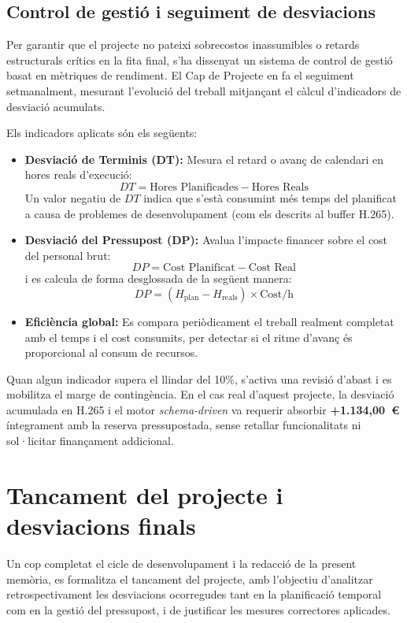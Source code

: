 \subsection{Control de gestió i seguiment de desviacions}
Per garantir que el projecte no pateixi sobrecostos inassumibles o retards estructurals crítics en la fita final, s'ha dissenyat un sistema de control de gestió basat en mètriques de rendiment. El Cap de Projecte en fa el seguiment setmanalment, mesurant l'evolució del treball mitjançant el càlcul d'indicadors de desviació acumulats.

Els indicadors aplicats són els següents:
\begin{itemize}
  \item \textbf{Desviació de Terminis (DT):} Mesura el retard o avanç de calendari en hores reals d'execució:
  \[ DT = \text{Hores Planificades} - \text{Hores Reals} \]
  Un valor negatiu de $DT$ indica que s'està consumint més temps del planificat a causa de problemes de desenvolupament (com els descrits al buffer H.265).
  \item \textbf{Desviació del Pressupost (DP):} Avalua l'impacte financer sobre el cost del personal brut:
  \[ DP = \text{Cost Planificat} - \text{Cost Real} \]
  i es calcula de forma desglossada de la següent manera:
  \[ DP = (H_{\text{plan}} - H_{\text{reals}}) \times \text{Cost/h} \]
  \item \textbf{Eficiència global:} Es compara periòdicament el treball realment completat amb el temps i el cost consumits, per detectar si el ritme d'avanç és proporcional al consum de recursos.
\end{itemize}

Quan algun indicador supera el llindar del 10\%, s'activa una revisió d'abast i es mobilitza el marge de contingència. En el cas real d'aquest projecte, la desviació acumulada en H.265 i el motor \textit{schema-driven} va requerir absorbir \textbf{+1.134,00~\euro{}} íntegrament amb la reserva pressupostada, sense retallar funcionalitats ni sol·licitar finançament addicional.

\section{Tancament del projecte i desviacions finals}
\label{sec:tancament_projecte}

Un cop completat el cicle de desenvolupament i la redacció de la present memòria, es formalitza el tancament del projecte, amb l'objectiu d'analitzar retrospectivament les desviacions ocorregudes tant en la planificació temporal com en la gestió del pressupost, i de justificar les mesures correctores aplicades.

